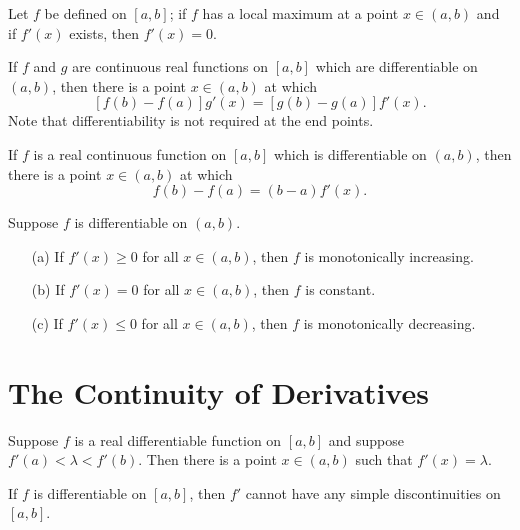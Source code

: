 \documentclass[11pt,a4paper]{book}
\begin{document}
\begin{theorem}[5.8]
    Let \( f  \) be defined on \( [a,b] \); if \( f \) has a local maximum at a point \( x \in (a,b) \) and if \( f'(x) \) exists, then \( f'(x) = 0 \).
\end{theorem}

\begin{theorem}[5.9]
    If \(  f  \) and \( g \) are continuous real functions on \( [a,b] \) which are differentiable on \( (a,b) \), then there is a point \( x \in (a,b) \) at which 
    \[  [f(b) - f(a)]g'(x) = [g(b) - g(a)]f'(x). \]
    Note that differentiability is not required at the end points.

\end{theorem}

\begin{theorem}[5.10]
    If \( f  \) is a real continuous function on \( [a,b] \) which is differentiable on \( (a,b) \), then there is a point \( x \in (a,b) \) at which 
    \[  f(b) - f(a) = (b-a) f'(x). \]
\end{theorem}

\begin{theorem}[5.11]
    Suppose \( f  \) is differentiable on \( (a,b) \). 
    \begin{enumerate}
        \item[(a)] If \( f'(x) \geq 0  \) for all \( x \in (a,b) \), then \( f  \) is monotonically increasing.
        \item[(b)] If \( f'(x) = 0  \) for all \( x \in (a,b) \), then \( f  \) is constant.
        \item[(c)] If \( f'(x) \leq 0  \) for all \( x \in (a,b) \), then \( f  \) is monotonically decreasing.
    \end{enumerate}
\end{theorem}

\section{The Continuity of Derivatives}

\begin{theorem}[5.12]
    Suppose \( f  \) is a real differentiable function on \( [a,b] \) and suppose \( f'(a) < \lambda < f'(b) \). Then there is a point \( x \in (a,b) \) such that \( f'(x) = \lambda  \). 
\end{theorem}

\begin{corollary}[5.12]
    If \( f  \) is differentiable on \( [a,b] \), then \( f' \) cannot have any simple discontinuities on \( [a,b] \). 
\end{corollary}
\end{document}
